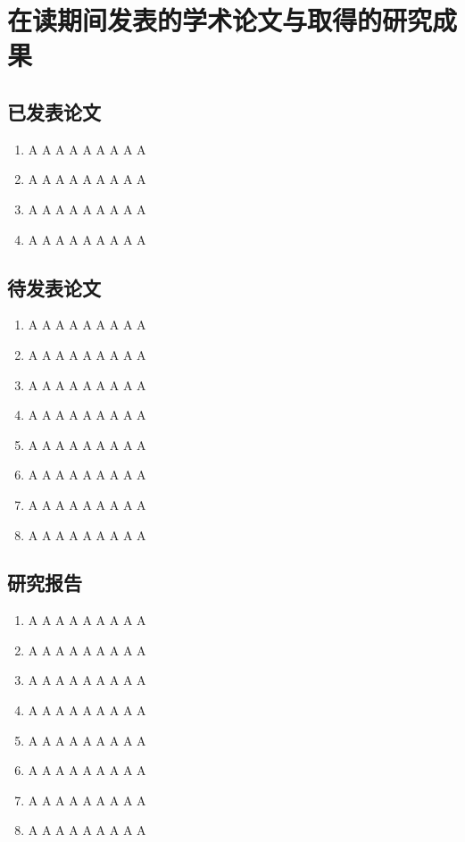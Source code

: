 ﻿\chapter{在读期间发表的学术论文与取得的研究成果}

\section*{已发表论文}

\begin{enumerate}
\item A A A A A A A A A
\item A A A A A A A A A
\item A A A A A A A A A
\item A A A A A A A A A
\end{enumerate}

\section*{待发表论文}

\begin{enumerate}
\item A A A A A A A A A
\item A A A A A A A A A
\item A A A A A A A A A
\item A A A A A A A A A
\item A A A A A A A A A
\item A A A A A A A A A
\item A A A A A A A A A
\item A A A A A A A A A
\end{enumerate}

\section*{研究报告}
\begin{enumerate}
\item A A A A A A A A A
\item A A A A A A A A A
\item A A A A A A A A A
\item A A A A A A A A A
\item A A A A A A A A A
\item A A A A A A A A A
\item A A A A A A A A A
\item A A A A A A A A A
\end{enumerate}
